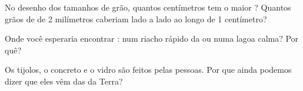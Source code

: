 \begin{exercise}[$\star\star$]\label{exo:g3:stones-pebbles-sand:8}
No desenho dos tamanhos de grão, quantos centímetros tem o maior ?
Quantos grãos de  de 2 milímetros caberiam lado a lado ao longo de
1 centímetro?
\end{exercise}

\begin{exercise}[$\star\star$]\label{exo:g3:stones-pebbles-sand:9}
Onde você esperaria encontrar : num riacho rápido da  ou numa
lagoa calma? Por quê?
\end{exercise}

\begin{exercise}[$\star\star$]\label{exo:g3:stones-pebbles-sand:10}
Os tijolos, o concreto e o vidro são feitos pelas pessoas. Por que ainda
podemos dizer que eles vêm das  da Terra?
\end{exercise}
